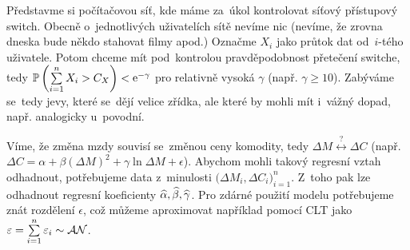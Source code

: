 \begin{example}[MEX] Představme si počítačovou síť, kde máme za~úkol kontrolovat síťový přístupový switch. Obecně o~jednotlivých uživatelích sítě nevíme nic (nevíme, že zrovna dneska bude někdo stahovat filmy apod.) Označme $X_i$ jako průtok dat od~$i$-tého uživatele. Potom chceme mít pod~kontrolou pravděpodobnost přetečení switche, tedy $\mathbb{P}\left( \sum\limits_{i=1}^{n} X_i>C_X \right)<\mathrm{e}^{-\gamma}$ pro relativně vysoká $\gamma$ (např. $\gamma\geq 10$). Zabýváme se~tedy jevy, které se~dějí velice zřídka, ale které by mohli mít i~vážný dopad, např. analogicky u~povodní. 
\end{example}
\begin{example}[Ekonometrie]
	Víme, že změna mzdy souvisí se~změnou ceny komodity, tedy $\Delta M \stackrel{?}{\leftrightarrow}\Delta C$ (např. $\Delta C=\alpha+\beta(\Delta M)^2+\gamma\ln\Delta M+\epsilon$). Abychom mohli takový regresní vztah odhadnout, potřebujeme data z~minulosti $\big(\Delta M_i,\Delta C_i\big)_{i=1}^n$. Z~toho pak lze odhadnout regresní koeficienty $\widehat{\alpha},\widehat{\beta},\widehat{\gamma}$. Pro zdárné použití modelu potřebujeme znát rozdělení $\epsilon$, což můžeme aproximovat například pomocí CLT jako $\varepsilon=\sum\limits_{i=1}^{n} \varepsilon_i\sim\mathcal{AN}$.
\end{example}


